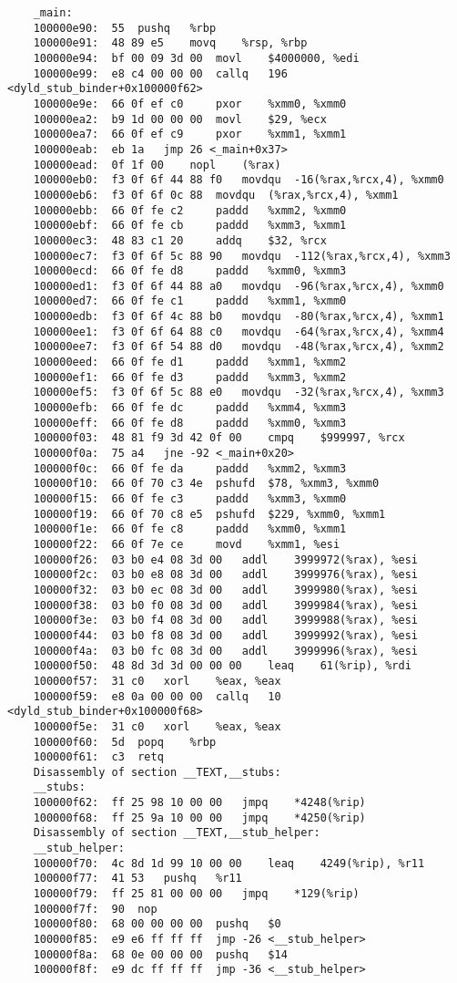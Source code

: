 \documentclass[a4paper]{article}
\begin{document}
\begin{lstlisting}
    _main:
    100000e90:	55 	pushq	%rbp
    100000e91:	48 89 e5 	movq	%rsp, %rbp
    100000e94:	bf 00 09 3d 00 	movl	$4000000, %edi
    100000e99:	e8 c4 00 00 00 	callq	196 <dyld_stub_binder+0x100000f62>
    100000e9e:	66 0f ef c0 	pxor	%xmm0, %xmm0
    100000ea2:	b9 1d 00 00 00 	movl	$29, %ecx
    100000ea7:	66 0f ef c9 	pxor	%xmm1, %xmm1
    100000eab:	eb 1a 	jmp	26 <_main+0x37>
    100000ead:	0f 1f 00 	nopl	(%rax)
    100000eb0:	f3 0f 6f 44 88 f0 	movdqu	-16(%rax,%rcx,4), %xmm0
    100000eb6:	f3 0f 6f 0c 88 	movdqu	(%rax,%rcx,4), %xmm1
    100000ebb:	66 0f fe c2 	paddd	%xmm2, %xmm0
    100000ebf:	66 0f fe cb 	paddd	%xmm3, %xmm1
    100000ec3:	48 83 c1 20 	addq	$32, %rcx
    100000ec7:	f3 0f 6f 5c 88 90 	movdqu	-112(%rax,%rcx,4), %xmm3
    100000ecd:	66 0f fe d8 	paddd	%xmm0, %xmm3
    100000ed1:	f3 0f 6f 44 88 a0 	movdqu	-96(%rax,%rcx,4), %xmm0
    100000ed7:	66 0f fe c1 	paddd	%xmm1, %xmm0
    100000edb:	f3 0f 6f 4c 88 b0 	movdqu	-80(%rax,%rcx,4), %xmm1
    100000ee1:	f3 0f 6f 64 88 c0 	movdqu	-64(%rax,%rcx,4), %xmm4
    100000ee7:	f3 0f 6f 54 88 d0 	movdqu	-48(%rax,%rcx,4), %xmm2
    100000eed:	66 0f fe d1 	paddd	%xmm1, %xmm2
    100000ef1:	66 0f fe d3 	paddd	%xmm3, %xmm2
    100000ef5:	f3 0f 6f 5c 88 e0 	movdqu	-32(%rax,%rcx,4), %xmm3
    100000efb:	66 0f fe dc 	paddd	%xmm4, %xmm3
    100000eff:	66 0f fe d8 	paddd	%xmm0, %xmm3
    100000f03:	48 81 f9 3d 42 0f 00 	cmpq	$999997, %rcx
    100000f0a:	75 a4 	jne	-92 <_main+0x20>
    100000f0c:	66 0f fe da 	paddd	%xmm2, %xmm3
    100000f10:	66 0f 70 c3 4e 	pshufd	$78, %xmm3, %xmm0
    100000f15:	66 0f fe c3 	paddd	%xmm3, %xmm0
    100000f19:	66 0f 70 c8 e5 	pshufd	$229, %xmm0, %xmm1
    100000f1e:	66 0f fe c8 	paddd	%xmm0, %xmm1
    100000f22:	66 0f 7e ce 	movd	%xmm1, %esi
    100000f26:	03 b0 e4 08 3d 00 	addl	3999972(%rax), %esi
    100000f2c:	03 b0 e8 08 3d 00 	addl	3999976(%rax), %esi
    100000f32:	03 b0 ec 08 3d 00 	addl	3999980(%rax), %esi
    100000f38:	03 b0 f0 08 3d 00 	addl	3999984(%rax), %esi
    100000f3e:	03 b0 f4 08 3d 00 	addl	3999988(%rax), %esi
    100000f44:	03 b0 f8 08 3d 00 	addl	3999992(%rax), %esi
    100000f4a:	03 b0 fc 08 3d 00 	addl	3999996(%rax), %esi
    100000f50:	48 8d 3d 3d 00 00 00 	leaq	61(%rip), %rdi
    100000f57:	31 c0 	xorl	%eax, %eax
    100000f59:	e8 0a 00 00 00 	callq	10 <dyld_stub_binder+0x100000f68>
    100000f5e:	31 c0 	xorl	%eax, %eax
    100000f60:	5d 	popq	%rbp
    100000f61:	c3 	retq
    Disassembly of section __TEXT,__stubs:
    __stubs:
    100000f62:	ff 25 98 10 00 00 	jmpq	*4248(%rip)
    100000f68:	ff 25 9a 10 00 00 	jmpq	*4250(%rip)
    Disassembly of section __TEXT,__stub_helper:
    __stub_helper:
    100000f70:	4c 8d 1d 99 10 00 00 	leaq	4249(%rip), %r11
    100000f77:	41 53 	pushq	%r11
    100000f79:	ff 25 81 00 00 00 	jmpq	*129(%rip)
    100000f7f:	90 	nop
    100000f80:	68 00 00 00 00 	pushq	$0
    100000f85:	e9 e6 ff ff ff 	jmp	-26 <__stub_helper>
    100000f8a:	68 0e 00 00 00 	pushq	$14
    100000f8f:	e9 dc ff ff ff 	jmp	-36 <__stub_helper>
\end{lstlisting}
\end{document}
